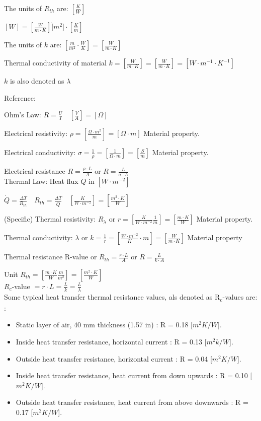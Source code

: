 The units of $R_{th}$ are: $ [\frac{K}{W}] $

$ [W] = [\frac{W}{m \cdot K}] \dot [m^2] \cdot [\frac{K}{m}] $

The units of $k$ are: $ [\frac{m}{m^2} \cdot \frac{W}{K}] = [\frac{W}{m \cdot K}]$

Thermal conductivity of material $k = [\frac{W}{m \cdot K }] = [\frac{W}{m \cdot K }]  = [W \cdot m^{-1} \cdot K^{-1}]$

$k$ is also denoted as $\lambda$

Reference: \cite{ELECRESCOND}

Ohm's Law: $ R = \frac{U}{I} \quad [\frac{V}{A}] = [\Omega] $

Electrical resistivity: $ \rho = [\frac{\Omega \cdot m^2}{m} ] = [\Omega \cdot m] $ Material property.

Electrical conductivity: $ \sigma = \frac{1}{\rho} =[\frac{1}{\Omega \cdot m}] = [\frac{S}{m}] $ Material property.

Electrical resistance $ R = \frac{\rho \cdot L}{A} $ or $ R = \frac{L}{\sigma \cdot A} $
\\

Thermal Law: 
Heat flux $ \dot Q $ in $ [W \cdot m^{-2}] $

$ \dot Q = \frac{\Delta T}{R_{th}} \quad R_{th} = \frac{\Delta T}{\dot  Q} 
\quad [\frac{K}{W \cdot m^{-2}}] = [\frac{m^2 \cdot K}{W}]$

(Specific) Thermal resistivity: $ R_\lambda $ or $ r = [\frac{K}{W \cdot m^{-2}} \frac{1}{m} ] = [\frac{m \cdot K}{W}] $ Material property.

Thermal conductivity: $ \lambda $ or $ k  = \frac{1}{r} = [\frac{ W \cdot m^{-2} }{K} \cdot m] 
= [\frac{W}{m \cdot K}] $ Material property

Thermal resistance R-value or $ R_{th} = \frac{r \cdot L}{A} $ or $ R = \frac{L}{k \cdot A} $

Unit $ R_{th} = [\frac{m \cdot K}{W} \frac{m}{m^2}] = [\frac{m^2 \cdot K}{W}] $
\\

$R_c$-value $ = r \cdot L = \frac{L}{k} = \frac{L}{\lambda} $
\\

Some typical heat transfer thermal resistance values, als denoted as R\textsubscript{c}-values are: \cite{OVERALL}: 

\begin{itemize}
	\item Static layer of air, 40 mm thickness (1.57 in)  : R = 0.18 [$m^2K/W$].
	\item Inside heat transfer resistance, horizontal current : R = 0.13 [$m^2k/W$]. 
	\item Outside heat transfer resistance, horizontal current : R = 0.04 [$m^2K/W$].
	\item Inside heat transfer resistance, heat current from down upwards : R = 0.10 [$m^2K/W$].
	\item Outside heat transfer resistance, heat current from above downwards : R = 0.17 [$m^2K/W$].
	
\end{itemize}

